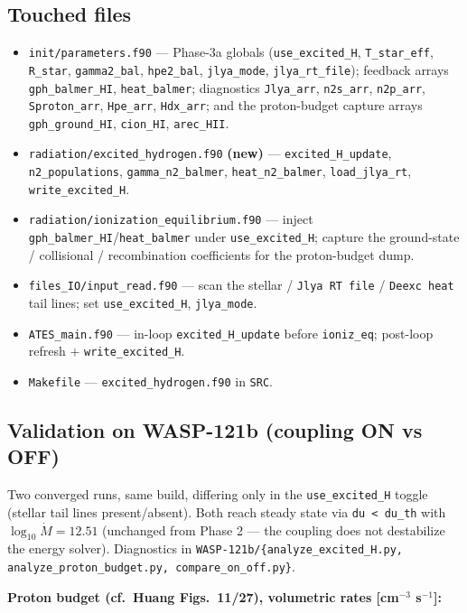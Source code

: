 \documentclass[english,a4paper]{kiseon_memo}
\begin{document}
\subsection{Touched files}
\begin{itemize}
  \item \texttt{init/parameters.f90} --- Phase-3a globals (\verb|use_excited_H|,
    \verb|T_star_eff|, \verb|R_star|, \verb|gamma2_bal|, \verb|hpe2_bal|,
    \verb|jlya_mode|, \verb|jlya_rt_file|); feedback arrays \verb|gph_balmer_HI|,
    \verb|heat_balmer|; diagnostics \verb|Jlya_arr|, \verb|n2s_arr|,
    \verb|n2p_arr|, \verb|Sproton_arr|, \verb|Hpe_arr|, \verb|Hdx_arr|; and the
    proton-budget capture arrays \verb|gph_ground_HI|, \verb|cion_HI|,
    \verb|arec_HII|.
  \item \texttt{radiation/excited\_hydrogen.f90} \textbf{(new)} ---
    \verb|excited_H_update|, \verb|n2_populations|, \verb|gamma_n2_balmer|,
    \verb|heat_n2_balmer|, \verb|load_jlya_rt|, \verb|write_excited_H|.
  \item \texttt{radiation/ionization\_equilibrium.f90} --- inject
    \verb|gph_balmer_HI|/\verb|heat_balmer| under \verb|use_excited_H|; capture the
    ground-state / collisional / recombination coefficients for the proton-budget
    dump.
  \item \texttt{files\_IO/input\_read.f90} --- scan the stellar / \verb|Jlya RT file|
    / \verb|Deexc heat| tail lines; set \verb|use_excited_H|, \verb|jlya_mode|.
  \item \texttt{ATES\_main.f90} --- in-loop \verb|excited_H_update| before
    \verb|ioniz_eq|; post-loop refresh $+$ \verb|write_excited_H|.
  \item \texttt{Makefile} --- \verb|excited_hydrogen.f90| in \verb|SRC|.
\end{itemize}

\subsection{Validation on WASP-121b (coupling ON vs OFF)}

Two converged runs, same build, differing only in the \verb|use_excited_H| toggle
(stellar tail lines present/absent). Both reach steady state via
\verb|du < du_th| with \textbf{\(\log_{10}\dot M = 12.51\)} (unchanged from
Phase 2 --- the coupling does not destabilize the energy solver). Diagnostics in
\texttt{WASP-121b/\{analyze\_excited\_H.py, analyze\_proton\_budget.py,
compare\_on\_off.py\}}.

\medskip\noindent\textbf{Proton budget (cf.\ Huang Figs.~11/27), volumetric rates
[cm\(^{-3}\) s\(^{-1}\)]:}
\end{document}
